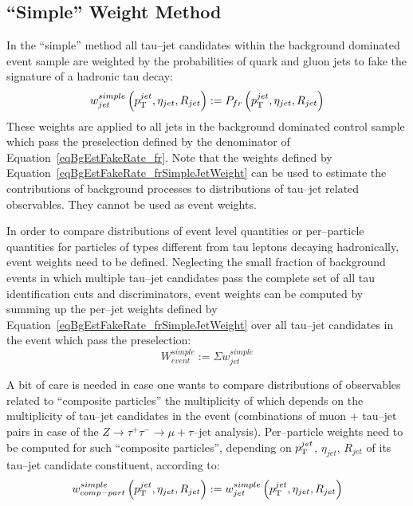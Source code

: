 \subsection{``Simple'' Weight Method}
%
In the ``simple'' method all tau--jet candidates within the background dominated
event sample are weighted by the probabilities of quark and gluon jets to fake
the signature of a hadronic tau decay:
\begin{equation}
w_{jet}^{simple} \left( p_{\mathrm{T}}^{jet}, \eta_{jet}, R_{jet} \right) := P_{fr} \left( p_{\mathrm{T}}^{jet}, \eta_{jet}, R_{jet} \right)
\label{eqBgEstFakeRate_frSimpleJetWeight}
\end{equation}
These weights are applied to all jets in the background dominated control sample
which pass the preselection defined by the denominator of
Equation~\ref{eqBgEstFakeRate_fr}.  Note that the weights defined by
Equation~\ref{eqBgEstFakeRate_frSimpleJetWeight} can be used to estimate the
contributions of background processes to distributions of tau--jet related
observables.  They cannot be used as event weights.

In order to compare distributions of event level quantities or per--particle
quantities for particles of types different from tau leptons decaying
hadronically, event weights need to be defined.  Neglecting the small fraction
of background events in which multiple tau--jet candidates pass the complete set
of all tau identification cuts and discriminators, event weights can be computed
by summing up the per--jet weights defined by
Equation~\ref{eqBgEstFakeRate_frSimpleJetWeight} over all tau--jet candidates in
the event which pass the preselection:
\begin{equation}
W_{event}^{simple} := \Sigma w_{jet}^{simple}
\label{eqBgEstFakeRate_frSimpleEventWeight}
\end{equation}

A bit of care is needed in case one wants to compare distributions of
observables related to ``composite particles'' the multiplicity of which depends
on the multiplicity of tau--jet candidates in the event (\eg combinations of
muon + tau--jet pairs in case of the $Z \rightarrow \tau^{+} \tau^{-}
\rightarrow \mu + \tau\mbox{--jet}$ analysis).  Per--particle weights need to be
computed for such ``composite particles'', depending on $p_{\mathrm{T}}^{jet}$,
$\eta_{jet}$, $R_{jet}$ of its tau--jet candidate constituent, according to:
\begin{equation}
w_{comp-part}^{simple} \left( p_{\mathrm{T}}^{jet}, \eta_{jet}, R_{jet} \right) := 
  w_{jet}^{simple} \left( p_{\mathrm{T}}^{jet}, \eta_{jet}, R_{jet} \right)
\label{eqBgEstFakeRate_frSimpleCompositeParticleWeight}
\end{equation}

